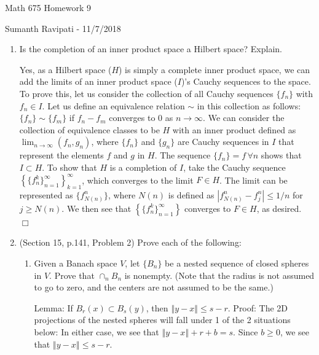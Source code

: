 \documentclass[12pt,letterpaper,reqno]{amsart}
\newcommand{\Norm}[1]{\left\Vert #1 \right \Vert}
\begin{document}
\thispagestyle{empty}
\centerline{\Large Math 675 Homework 9}
\centerline{Sumanth Ravipati - 11/7/2018}
\vspace{.25in}

\begin{enumerate}[1.]
\item Is the completion of an inner product space a Hilbert space? Explain.\newline
\begin{flushleft}
Yes, as a Hilbert space ($H$) is simply a complete inner product space, we can add the limits of an inner product space ($I$)'s Cauchy sequences to the space. To prove this, let us consider the collection of all Cauchy sequences $\{f_n\}$ with $f_n \in I$. Let us define an equivalence relation $\sim$ in this collection as follows: $\{f_n\} \sim \{f_m\}$ if $f_n - f_m$ converges to 0 as $n \rightarrow \infty$. We can consider the collection of equivalence classes to be $H$ with an inner product defined as $\lim_{n\rightarrow\infty}(f_n,g_n)$, where $\{f_n\}$ and $\{g_n\}$ are Cauchy sequences in $I$ that represent the elements $f$ and $g$ in $H$. The sequence $\{f_n\} = f \, \forall n$ shows that $I \subset H$. To show that $H$ is a completion of $I$, take the Cauchy sequence $\left\{\{f_n^k\}_{n=1}^\infty\right\}_{k=1}^\infty$, which converges to the limit $F \in H$. The limit can be represented as $\{f^n_{N(n)}\}$, where $N(n)$ is defined as $\left| f _ { N ( n ) } ^ { n } - f _ { j } ^ { n } \right| \leq 1/n$ for $j \geq N(n)$. We then see that $\left\{\{f_n^k\}_{n=1}^\infty\right\}$ converges to $F \in H$, as desired. $\Box$
\newline
\end{flushleft}
\item (Section 15, p.141, Problem 2) Prove each of the following:
\begin{enumerate}
\item Given a Banach space $V$, let $\{B_n\}$ be a nested sequence of closed spheres in $V$. Prove that $\cap_n B_n$ is nonempty. (Note that the radius is not assumed to go to zero, and the centers are not assumed to be the same.)\newline
\begin{flushleft}
Lemma: If $B_r(x) \subset B_s(y)$, then $\Norm{y - x} \leq s - r$. Proof: The 2D projections of the nested spheres will fall under 1 of the 2 situations below:\vspace{1.75in}
\newline
In either case, we see that $\Norm{y - x} + r + b = s$. Since $b \geq 0$, we see that $\Norm{y - x} \leq s - r$.

\end{flushleft}
\end{enumerate}
\end{enumerate}
\end{document}
